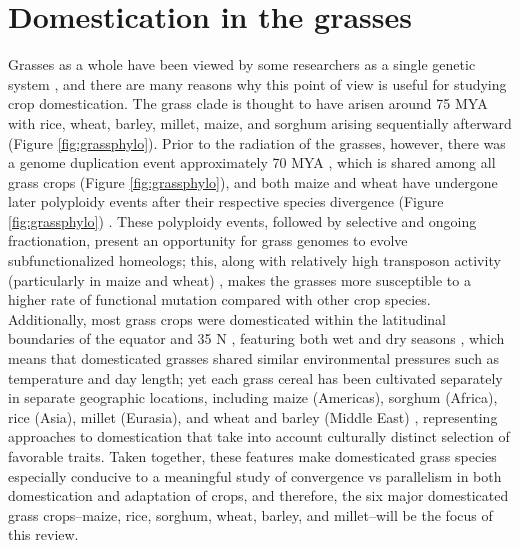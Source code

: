 \documentclass[12pt]{article}
\begin{document}
\section*{Domestication in the grasses}
Grasses as a whole have been viewed by some researchers as a single genetic system \citep{pmid8379002, pmid11244100}, and there are many reasons why this point of view is useful for studying crop domestication.
The grass clade is thought to have arisen around 75 MYA \citep{BOUCHENAKKHELLADI2010, Kellogg2001} with rice, wheat, barley, millet, maize, and sorghum arising sequentially afterward (Figure \ref{fig:grassphylo}).
Prior to the radiation of the grasses, however, there was a genome duplication event approximately 70 MYA \citep{Paterson2004}, which is shared among all grass crops (Figure \ref{fig:grassphylo}), and both maize and wheat have undergone later polyploidy events after their respective species divergence (Figure \ref{fig:grassphylo}) \citep{Levy2002}.
These polyploidy events, followed by selective and ongoing fractionation, present an opportunity for grass genomes to evolve subfunctionalized homeologs; this, along with relatively high transposon activity (particularly in maize and wheat) \citep{Wicker2016, Lisch2001}, makes the grasses more susceptible to a higher rate of functional mutation compared with other crop species.  
Additionally, most grass crops were domesticated within the latitudinal boundaries of the equator and 35 N \citep{Jain1993, Gepts2010}, featuring both wet and dry seasons \citep{Jain1993}, which means that domesticated grasses shared similar environmental pressures such as temperature and day length; yet each grass cereal has been cultivated separately in separate geographic locations, including maize (Americas), sorghum (Africa), rice (Asia), millet (Eurasia), and wheat and barley (Middle East) \citep{Glmin2009}, representing approaches to domestication that take into account culturally distinct selection of favorable traits.
Taken together, these features make domesticated grass species especially conducive to a meaningful study of convergence vs parallelism in both domestication and adaptation of crops, and therefore, the six major domesticated grass crops--maize, rice, sorghum, wheat, barley, and millet--will be the focus of this review. 
\end{document}
